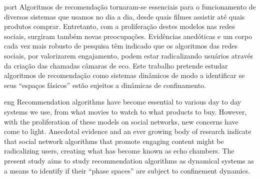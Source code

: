 
\begin{resumo}{port}
Algoritmos de recomendação tornaram-se essenciais para o funcionamento de
diversos sistemas que usamos no dia a dia, desde quais filmes assistir até quais
produtos comprar. Entretanto, com a proliferação destes modelos nas redes
sociais, surgiram também novas preocupações. Evidências anedóticas e um corpo
cada vez mais robusto de pesquisa têm indicado que os algoritmos das redes
sociais, por valorizarem engajamento, podem estar radicalizando usuários através
da criação das chamadas câmaras de eco. Este trabalho pretende estudar
algoritmos de recomendação como sistemas dinâmicos de modo a identificar se seus
``espaços fásicos'' estão sujeitos a dinâmicas de confinamento.
\end{resumo}

\begin{resumo}{eng}
Recommendation algorithms have become essential to various day to day systems we
use, from what movies to watch to what products to buy. However, with the
proliferation of these models on social networks, new concerns have come to
light. Anecdotal evidence and an ever growing body of research indicate that
social network algorithms that promote engaging content might be radicalizing
users, creating what has become known as echo chambers. The present study aims
to study recommendation algorithms as dynamical systems as a means to identify
if their ``phase spaces'' are subject to confinement dynamics.
\end{resumo}
